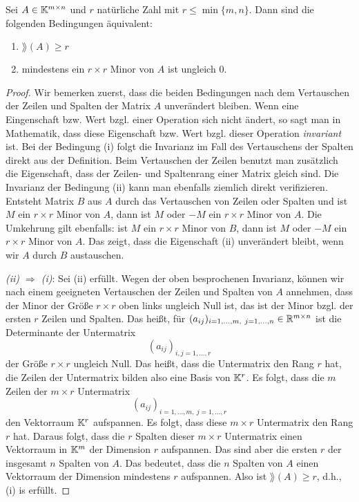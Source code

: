 \begin{thm}
	Sei $ A \in \mathbb K^{m \times n} $ und $r$ natürliche Zahl mit $r \le \min \{m,n\}$. Dann sind die folgenden Bedingungen äquivalent:
	\begin{enumerate}
		\item
			$ \rang(A) \geq r $
		\item
			mindestens ein $ r \times r $ Minor von $ A $ ist ungleich $0$.
	\end{enumerate}
\end{thm}
\begin{proof} Wir bemerken zuerst, dass die beiden Bedingungen nach dem Vertauschen der Zeilen und Spalten der Matrix $A$ unverändert bleiben. Wenn eine Eingenschaft bzw. Wert bzgl. einer Operation sich nicht ändert, so sagt man in Mathematik, dass diese Eigenschaft bzw. Wert bzgl. dieser Operation \emph{invariant} ist. Bei der Bedingung (i)  folgt die Invarianz im Fall des Vertauschens der Spalten direkt aus der Definition. Beim Vertauschen der Zeilen benutzt man zusätzlich die Eigenschaft, dass der Zeilen- und Spaltenrang einer Matrix gleich sind. Die Invarianz der Bedingung (ii) kann man ebenfalls ziemlich direkt verifizieren. Entsteht Matrix $B$ aus $A$ durch das Vertauschen von Zeilen oder Spalten und ist $M$ ein $r \times r$ Minor von $A$, dann ist $M$ oder $-M$ ein $r \times r$ Minor von $A$. Die Umkehrung gilt ebenfalls: ist $M$ ein $r \times r$ Minor von $B$, dann ist $M$ oder $-M$ ein $r \times r$ Minor von $A$. Das zeigt, dass die Eigenschaft (ii) unverändert bleibt, wenn wir $A$ durch $B$ austauschen. 
	
	
	\emph{(ii) $ \Rightarrow $ (i)}: Sei (ii) erfüllt. Wegen der oben besprochenen Invarianz, können wir nach einem geeigneten Vertauschen der Zeilen und Spalten von $A$ annehmen, dass der Minor der Größe $r \times r$ oben links ungleich Null ist, das ist der Minor bzgl. der ersten $r$ Zeilen und Spalten. Das heißt, für $(a_{ij})_{i=1,\ldots,m, \ j=1,\ldots,n} \in \mathbb R^{m \times n}$ ist die Determinante der Untermatrix 
	\[
		(a_{ij})_{i,j=1,\ldots,r}
	\]
	der Größe $r \times r$ ungleich Null. Das heißt, dass die Untermatrix den Rang $r$ hat, die Zeilen der Untermatrix bilden also eine Basis von $\mathbb K^r$. Es folgt, dass die $m$ Zeilen der $m \times r$ Untermatrix 
	\[
		(a_{ij})_{i=1,\ldots,m, \ j=1,\ldots,r}
	\]
	den Vektorraum $\mathbb K^r$ aufspannen. Es folgt, dass diese $m \times r$ Untermatrix den Rang $r$ hat. Daraus folgt, dass die $r$ Spalten dieser $m \times r$ Untermatrix einen Vektorraum in $\mathbb K^m$ der Dimension $r$ aufspannen. Das sind aber die ersten $r$ der insgesamt $n$ Spalten von $A$. Das bedeutet, dass die $n$ Spalten von $A$ einen Vektorraum der Dimension mindestens $r$ aufspannen. Also ist $\rang(A) \ge r$, d.h., (i) is erfüllt. 


\end{proof}
